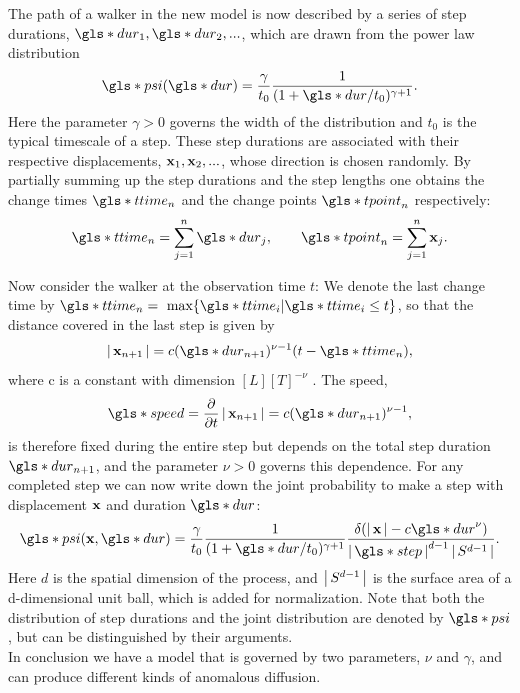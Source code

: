 The path of a walker in the new model is now described by a series of step durations, $\gls*{dur}_1, \gls*{dur}_2, ...$, which are drawn from the power law distribution 
%
\begin{align}
\gls*{psi}(\gls*{dur}) = \frac{\gamma}{t_0} \frac{1}{(1+\gls*{dur}/t_0)^{\gamma+1}} .
\label{eqn:defPsiT}
\end{align}
%
Here the parameter $\gamma>0$ governs the width of the distribution and $t_0$ is the typical timescale of a step. These step durations are associated with their respective displacements, $\mathbf{ x }_1, \mathbf{ x }_2, ...$, whose direction is chosen randomly. By partially summing up the step durations and the step lengths one obtains the change times $\gls*{ttime}_n$ and the change points $\gls*{tpoint}_n$ respectively:
%
\begin{align}
\gls*{ttime}_n = \sum_{j=1}^n \gls*{dur}_j , \qquad \gls*{tpoint}_n = \sum_{j=1}^n \ve{x}_j .
\end{align}

Now consider the walker at the observation time $t$: We denote the last change time by $\gls*{ttime}_n = \text{ max} \{\gls*{ttime}_i | \gls*{ttime}_i \leq t \}$, so that the distance covered in the last step is given by
%
\begin{align}
\abs{\ve{x}_{n+1}} = c (\gls*{dur}_{n+1})^{\nu-1} (t-\gls*{ttime}_n) ,
\end{align}
%
where c is a constant with dimension $ [ L ] [ T ]^{-\nu} $ . The speed, 
%
\begin{align}
\gls*{speed} = \pder{}{t} \abs{\ve{x}_{n+1}} = c (\gls*{dur}_{n+1})^{\nu-1},
\end{align}
%
is therefore fixed during the entire step but depends on the total step duration $\gls*{dur}_{n+1}$, and the parameter $\nu>0$ governs this dependence. For any completed step we can now write down the joint probability to make a step with displacement $\mathbf{ x }$ and duration $\gls*{dur}$:
%
\begin{align}
\gls*{psi}(\ve{x}, \gls*{dur} ) = \frac{\gamma}{t_0} \frac{1}{(1+\gls*{dur}/t_0)^{\gamma+1}}  \frac{\delta(\abs{\ve{x}} - c \gls*{dur}^{\nu}) }{\abs{\gls*{step}}^{d-1} \abs{S^{d-1}}}  \label{eqn:defPsiXT}.
\end{align}
%
Here $d$ is the spatial dimension of the process, and $\left|\,S^{d-1}\,\right|$ is the surface area of a d-dimensional unit ball, which is added for normalization. Note that both the distribution of step durations and the joint distribution are denoted by $\gls*{psi}$, but can be distinguished by their arguments. \\
In conclusion we have a model that is governed by two parameters, $\nu$ and $\gamma$, and can produce different kinds of anomalous diffusion. 

